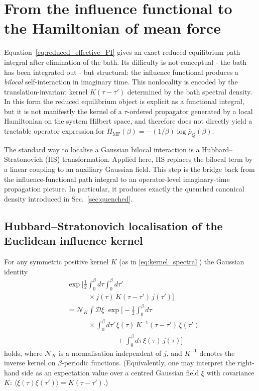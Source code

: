 \section{From the influence functional to the Hamiltonian of mean force}
\label{sec:hmf}

Equation~\eqref{eq:reduced_effective_PI} gives an exact reduced equilibrium path
integral after elimination of the bath. Its difficulty is not conceptual - the
bath has been integrated out - but structural: the influence functional produces
a \emph{bilocal} self-interaction in imaginary time. This nonlocality is encoded
by the translation-invariant kernel $K(\tau-\tau')$ determined by the bath
spectral density. In this form the reduced equilibrium object is explicit as a
functional integral, but it is not manifestly the kernel of a $\tau$-ordered
propagator generated by a local Hamiltonian on the system Hilbert space, and
therefore does not directly yield a tractable operator expression for
$H_{\mathrm{MF}}(\beta)=-(1/\beta)\log\bar\rho_Q(\beta)$.

The standard way to localise a Gaussian bilocal interaction is a
Hubbard--Stratonovich (HS) transformation. Applied here, HS replaces the bilocal
term by a linear coupling to an auxiliary Gaussian field. This step is the
bridge back from the influence-functional path integral to an operator-level
imaginary-time propagation picture. In particular, it produces exactly the
quenched canonical density introduced in Sec.~\ref{sec:quenched}.

\subsection{Hubbard--Stratonovich localisation of the Euclidean influence kernel}

For any symmetric positive kernel $K$ (as in \eqref{eq:kernel_spectral}) the
Gaussian identity
\begin{equation}
\begin{split}
    &\exp\!\bigg[
        \frac{1}{2}\int_0^\beta d\tau\int_0^\beta d\tau'
    \\
    &\qquad\quad\times
        j(\tau)\,K(\tau-\tau')\,j(\tau')
    \bigg]
    \\
    &=
    \mathcal N_K
    \int \mathcal D\xi\;
    \exp\bigg[
        -\frac{1}{2}\int_0^\beta d\tau
    \\
    &\qquad\quad\times
        \int_0^\beta d\tau'\,
        \xi(\tau)\,K^{-1}(\tau-\tau')\,\xi(\tau')
    \\
    &\qquad\qquad\qquad\quad
        +\int_0^\beta d\tau\,\xi(\tau)\,j(\tau)
    \bigg]
\end{split}
    \label{eq:HS_identity}
\end{equation}
holds, where $\mathcal N_K$ is a normalisation independent of $j$, and $K^{-1}$
denotes the inverse kernel on $\beta$-periodic functions. (Equivalently, one may
interpret the right-hand side as an expectation value over a centred Gaussian
field $\xi$ with covariance $K$:
$\langle\xi(\tau)\xi(\tau')\rangle = K(\tau-\tau')$.)

